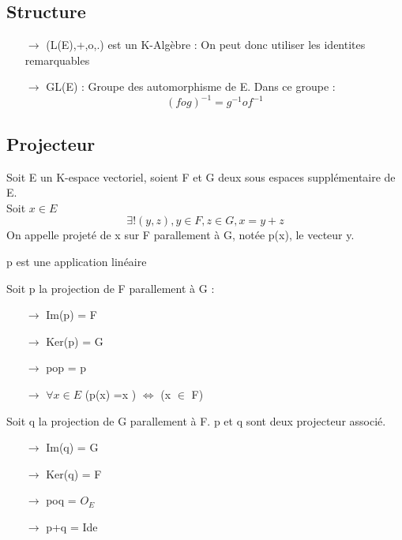 \subsection{Structure}
\begin{itemize}
 \item[$\rightarrow$] (L(E),+,o,.) est un K-Algèbre : On peut donc utiliser les identites remarquables
 \item[$\rightarrow$] GL(E) : Groupe des automorphisme de E. Dans ce groupe : $$(fog)^{-1} = g^{-1}of^{-1}$$
\end{itemize}
\subsection{Projecteur}
\begin{de}
Soit E un K-espace vectoriel, soient F et G deux sous espaces supplémentaire de E.\\
Soit $x \in E$
$$\exists !(y,z), y\in F, z\in G, x=y+z$$
On appelle projeté de x sur F parallement à G, notée p(x), le vecteur y.
\end{de}
\begin{prop}
p est une application linéaire
\end{prop}
\begin{prop}
Soit p la projection de F parallement à G :\\
 \begin{itemize}
 \item[$\rightarrow$] Im(p) = F\\
 \item[$\rightarrow$] Ker(p) = G\\
 \item[$\rightarrow$] pop = p\\
 \item[$\rightarrow$] $\forall x \in E$ (p(x) =x ) $\Leftrightarrow$ (x $\in$ F)\\
\end{itemize}
\end{prop}
\begin{prop}
Soit q la projection de G parallement à F. p et q sont deux projecteur associé.
 \begin{itemize}
 \item[$\rightarrow$] Im(q) = G\\
 \item[$\rightarrow$] Ker(q) = F\\
 \item[$\rightarrow$] poq = $O_E$\\
 \item[$\rightarrow$] p+q = Ide\\
\end{itemize}
\end{prop}
